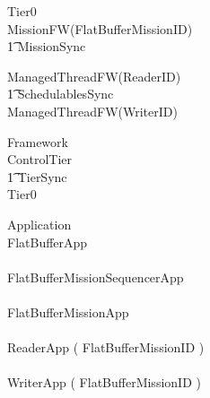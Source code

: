 \begin{circus}
\circprocess Tier0 \circdef \\

\circblockopen
	MissionFW(FlatBufferMissionID)\\
		\t1 	\lpar MissionSync \rpar \\
		\circblockopen



			ManagedThreadFW(ReaderID)\\
			\t1 \lpar SchedulablesSync \rpar\\
			ManagedThreadFW(WriterID)\\








		\circblockclose
\circblockclose
\end{circus}
%
%
%
\begin{circus}
\circprocess Framework \circdef \\
\circblockopen
ControlTier \\
\t1 \lpar TierSync \rpar \\
 \circblockopen
Tier0
\circblockclose
\circblockclose
\end{circus}
%
%
\begin{circus}
\circprocess  Application \circdef \\
\circblockopen
FlatBufferApp\\
\interleave\\
FlatBufferMissionSequencerApp\\
\interleave \\
		FlatBufferMissionApp\\
		\interleave \\
			ReaderApp ( FlatBufferMissionID  ) \\
			\interleave \\
			WriterApp ( FlatBufferMissionID  ) \\
			
		
\circblockclose
\end{circus}

